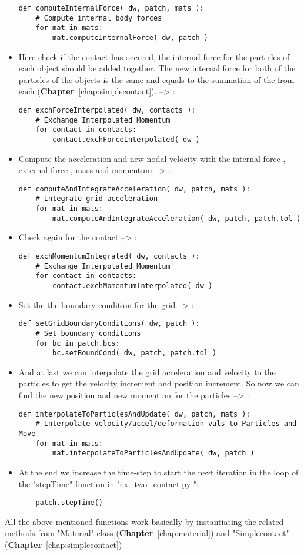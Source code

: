 \begin{itemize}
\begin{lstlisting}
def computeInternalForce( dw, patch, mats ):
    # Compute internal body forces
    for mat in mats:
        mat.computeInternalForce( dw, patch )
\end{lstlisting}
\item Here check if the contact has occured, the internal force for the particles of each object should be added together. The new internal force for both of the particles of the objects is the same and equals to the summation of the  from each (\textbf{Chapter}~\ref{chap:simplecontact}).  --> :
\begin{lstlisting}
def exchForceInterpolated( dw, contacts ):
    # Exchange Interpolated Momentum
    for contact in contacts:
        contact.exchForceInterpolated( dw )
\end{lstlisting}
\item Compute the acceleration and new nodal velocity with the internal force , external force , mass  and momentum  --> :
\begin{lstlisting}
def computeAndIntegrateAcceleration( dw, patch, mats ):
    # Integrate grid acceleration
    for mat in mats:
        mat.computeAndIntegrateAcceleration( dw, patch, patch.tol )  
\end{lstlisting}
\item Check again for the contact --> :
\begin{lstlisting}
def exchMomentumIntegrated( dw, contacts ):
    # Exchange Interpolated Momentum
    for contact in contacts:
        contact.exchMomentumInterpolated( dw )
\end{lstlisting}
\item Set the the boundary condition for the grid --> :
\begin{lstlisting}
def setGridBoundaryConditions( dw, patch ):
    # Set boundary conditions
    for bc in patch.bcs:
        bc.setBoundCond( dw, patch, patch.tol )
\end{lstlisting}
\item And at last we can interpolate the grid acceleration and velocity to the particles to get the velocity increment and position increment. So now we can find the new position and new momentum for the particles --> :
\begin{lstlisting}
def interpolateToParticlesAndUpdate( dw, patch, mats ):
    # Interpolate velocity/accel/deformation vals to Particles and Move
    for mat in mats:
        mat.interpolateToParticlesAndUpdate( dw, patch )
\end{lstlisting}
\item At the end we increase the time-step to start the next iteration in the  loop of the "stepTime" function in "ex\_two\_contact.py ":
\begin{lstlisting}	
	patch.stepTime() 
\end{lstlisting}
\end{itemize}

All the above mentioned functions work basically by instantiating the related methods from "Material" class (\textbf{Chapter}~\ref{chap:material}) and "Simplecontact" (\textbf{Chapter}~\ref{chap:simplecontact})
 

